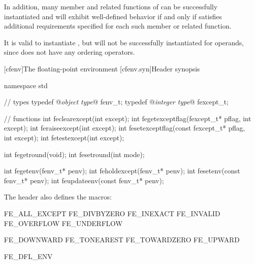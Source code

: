 \pnum
In addition, many member and related functions of
can be successfully instantiated
and will exhibit well-defined behavior if and only if
 satisfies additional requirements specified for each such member
or related function.

\pnum
\enterexample
It is valid to instantiate
,
but
will not be successfully instantiated for
operands, since
does not have any ordering operators.
\exitexample

[cfenv]{The floating-point environment}
[cfenv.syn]{Header  synopsis}
%
\begin{codeblock}
namespace std {
  // types
  typedef @\textit{object type}@  fenv_t;
  typedef @\textit{integer type}@ fexcept_t;

  // functions
  int feclearexcept(int except);
  int fegetexceptflag(fexcept_t* pflag, int except);
  int feraiseexcept(int except);
  int fesetexceptflag(const fexcept_t* pflag, int except);
  int fetestexcept(int except);

  int fegetround(void);
  int fesetround(int mode);

  int fegetenv(fenv_t* penv);
  int feholdexcept(fenv_t* penv);
  int fesetenv(const fenv_t* penv);
  int feupdateenv(const fenv_t* penv);
}
\end{codeblock}

\pnum
{}%
%
%
%
%
%
%
%
%
%
%
%
%
%
%
%
%
%
%
%
%
%
%
%
The header also defines the macros:
\begin{codeblock}
  FE_ALL_EXCEPT
  FE_DIVBYZERO
  FE_INEXACT
  FE_INVALID
  FE_OVERFLOW
  FE_UNDERFLOW

  FE_DOWNWARD
  FE_TONEAREST
  FE_TOWARDZERO
  FE_UPWARD

  FE_DFL_ENV
\end{codeblock}

